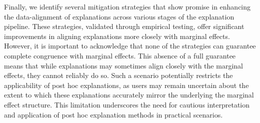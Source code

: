 \documentclass[12pt]{article}  %
\begin{document}
        
         Finally, we identify several mitigation strategies that show promise in enhancing the data-alignment of explanations across various stages of the explanation pipeline. These strategies, validated through empirical testing, offer significant improvements in aligning explanations more closely with marginal effects. However, it is important to acknowledge that none of the strategies can guarantee complete congruence with marginal effects. This absence of a full guarantee means that while explanations may sometimes align closely with the marginal effects, they cannot reliably do so. Such a scenario potentially restricts the applicability of post hoc explanations, as users may remain uncertain about the extent to which these explanations accurately mirror the underlying the marginal effect structure. This limitation underscores the need for cautious interpretation and application of post hoc explanation methods in practical scenarios.
        
        

            



        
\end{document}
